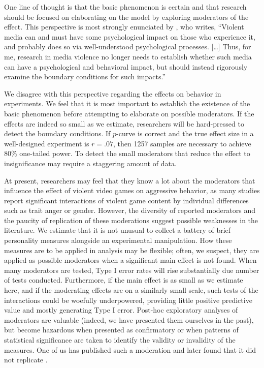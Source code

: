 \documentclass[man]{apa6}
\begin{document}
One line of thought is that the basic phenomenon is certain and that research should be focused on elaborating on the model by exploring moderators of the effect. This perspective is most strongly enunciated by \citet[p. 62]{Warburton:2014}, who writes, %
``Violent media can and must have some psychological impact on those who experience it, and probably does so via well-understood psychological processes. [\ldots] Thus, for me, research in media violence no longer needs to establish whether such media can have a psychological and behavioral impact, but should instead rigorously examine the boundary conditions for such impacts.'' 

We disagree with this perspective regarding the effects on behavior in experiments. We feel that it is most important to establish the existence of the basic phenomenon before attempting to elaborate on possible moderators. If the effects are indeed so small as we estimate, researchers will be hard-pressed to detect the boundary conditions. If $p$-curve is correct and the true effect size in a well-designed experiment is $r = .07$, then 1257 samples are necessary to achieve $80\%$ one-tailed power. To detect the small moderators that reduce the effect to insignificance may require a staggering amount of data.

At present, researchers may feel that they know a lot about the moderators that influence the effect of violent video games on aggressive behavior, as many studies report significant interactions of violent game content by individual differences such as trait anger or gender. However, the diversity of reported moderators and the paucity of replication of these moderations suggest possible weaknesses in the literature. 
We estimate that it is not unusual to collect a battery of brief personality measures alongside an experimental manipulation. How these measures are to be applied in analysis may be flexible; often, we suspect, they are applied as possible moderators when a significant main effect is not found. 
When many moderators are tested, Type I error rates will rise substantially due number of tests conducted. Furthermore, if the main effect is as small as we estimate here, and if the moderating effects are on a similarly small scale, such tests of the interactions could be woefully underpowered, providing little positive predictive value and mostly generating Type I error. Post-hoc exploratory analyses of moderators are valuable (indeed, we have presented them ourselves in the past), but become hazardous when presented as confirmatory or when patterns of statistical significance are taken to identify the validity or invalidity of the measures. 
One of us has published such a moderation \citep{Engelhardt:etal:2007} and later found that it did not replicate \citep{Engelhardt:etal:inprep}.
\end{document}
